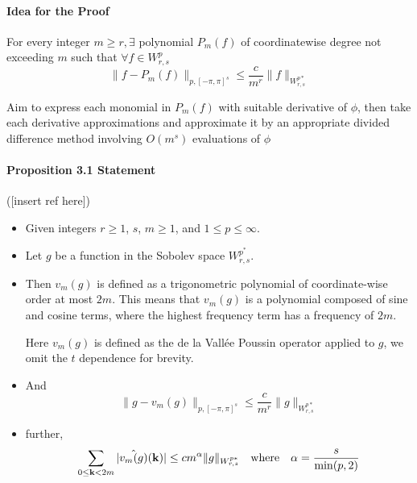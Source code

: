 \documentclass{article}
\begin{document}
\paragraph{Idea for the Proof}

For every integer \(m \geq r, \exists \) polynomial \(P_{m}(f)\) of coordinatewise degree not exceeding \(m\) such that \(\forall f \in W^{p}_{r,s}\) 
\[
\|f - P_{m}(f)\|_{p,[-\pi,\pi]^s} \leq \frac{c}{m^r} \|f\|_{W^{p*}_{r,s}}  
\]

Aim to express each monomial in \(P_{m}(f)\) with suitable derivative of \(\phi \), then take each derivative approximations and approximate it by an appropriate divided difference method involving \(O(m^s)\) evaluations of \(\phi \) 


\paragraph[]{Proposition 3.1 Statement}

([insert ref here])

\begin{itemize}
    \item  Given integers \( r \geq 1 \), \( s \), \( m \geq 1 \), and \( 1 \leq p \leq \infty \).
    \item  Let \( g \) be a function in the Sobolev space \( W^{p^{\ast}}_{r,s} \).
    
    \item Then \( v_m(g) \) is defined as a trigonometric polynomial of coordinate-wise order at most \( 2m \). This means that \( v_m(g) \) is a polynomial composed of sine and cosine terms, where the highest frequency term has a frequency of \( 2m \).
    
    Here \( v_m(g) \) is defined as the de la Vallée Poussin operator applied to \( g \), we omit the \(t\) dependence for brevity.
    \item And 
    \setcounter{equation}{1} 
    \begin{equation}
        \|g - v_m(g)\|_{p, [-\pi, \pi]^s} \leq \frac{c}{m^r} \|g\|_{W^{p*}_{r,s}}
    \end{equation}
    \item further,
    \begin{equation}
        \sum_{0 \leq \mathbf{k} < 2m} |\Hat{v_m(g)}(\mathbf{k})| \leq cm^\alpha \|g\|_{W^{p*}_{r,s}}  \quad \text{where} \quad \alpha = \frac{s}{\min(p,2)} 
    \end{equation}
\end{itemize}
\end{document}
